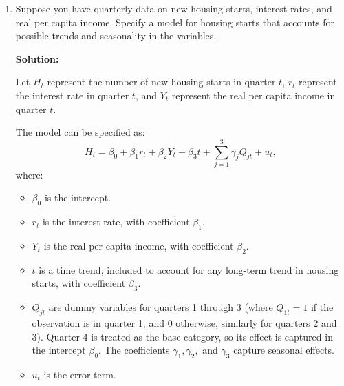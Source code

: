 \documentclass[12pt]{article}
\begin{document}
\begin{enumerate}
{\begin{enumerate}
        \item **Violation of Gauss-Markov Assumptions**: The Gauss-Markov assumption violated here is the assumption of no serial correlation. In other words, the assumption that the error term \( u_t \) is uncorrelated with itself across different time periods is violated because \( int_t \) is correlated with \( u_{t-1} \). When this assumption is violated, the OLS estimators are no longer BLUE (Best Linear Unbiased Estimators).

\end{enumerate}



}


\item Suppose you have quarterly data on new housing starts, interest rates, and real per capita income. Specify a model for housing starts that accounts for possible trends and seasonality in the variables.


{\color{blue}
\noindent \textbf{Solution:}

Let \( H_t \) represent the number of new housing starts in quarter \( t \), \( r_t \) represent the interest rate in quarter \( t \), and \( Y_t \) represent the real per capita income in quarter \( t \).

    The model can be specified as:
    \[
    H_t = \beta_0 + \beta_1 r_t + \beta_2 Y_t + \beta_3 t + \sum_{j=1}^{3} \gamma_j Q_{jt} + u_t,
    \]
    where:
    \begin{itemize}
        \item \( \beta_0 \) is the intercept.
        \item \( r_t \) is the interest rate, with coefficient \( \beta_1 \).
        \item \( Y_t \) is the real per capita income, with coefficient \( \beta_2 \).
        \item \( t \) is a time trend, included to account for any long-term trend in housing starts, with coefficient \( \beta_3 \).
        \item \( Q_{jt} \) are dummy variables for quarters 1 through 3 (where \( Q_{1t} = 1 \) if the observation is in quarter 1, and 0 otherwise, similarly for quarters 2 and 3). Quarter 4 is treated as the base category, so its effect is captured in the intercept \( \beta_0 \). The coefficients \( \gamma_1, \gamma_2, \) and \( \gamma_3 \) capture seasonal effects.
        \item \( u_t \) is the error term.
    \end{itemize}

}
\end{enumerate}
\end{document}

